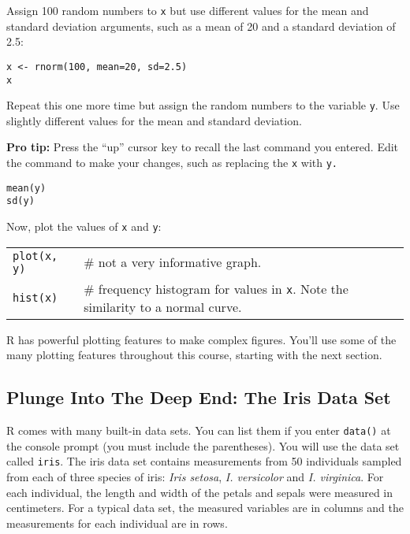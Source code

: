 \documentclass[11pt]{article}
\begin{document}
Assign 100 random numbers to \texttt{x} but use different values for the mean and
standard deviation arguments, such as a mean of 20 and a standard
deviation of 2.5:

\texttt{x \textless{}- rnorm(100, mean=20, sd=2.5)} \\
\texttt{x}

Repeat this one more time but assign the random numbers to the variable
\texttt{y}. Use slightly different values for the mean and standard deviation.

\textbf{Pro tip:} Press the “up” cursor key to recall the last command you entered. Edit the command to make your changes, such as replacing the \texttt{x} with \texttt{y.}

\texttt{mean(y)} \\
\texttt{sd(y)}

Now, plot the values of \texttt{x} and \texttt{y}:

\begin{tabular}{@{}L{1in}L{4.5in}@{}}
\texttt{plot(x, y)} & \# not a very informative graph. \\
\texttt{hist(x)} 	& \# frequency histogram for values in \texttt{x}. Note the similarity to a normal curve.\\
\end{tabular}

R has powerful plotting features to make complex figures.
You'll use some of the many plotting features throughout this course,
starting with the next section.

\subsection*{Plunge Into The Deep End: The Iris Data Set}

R comes with many built-in data sets. You can list them if you enter \texttt{data()} at the console prompt (you must include the parentheses). You will use the data set called
\texttt{iris}. The iris data set contains measurements from 50 individuals sampled from
each of three species of iris: \emph{Iris setosa}, \emph{I. versicolor}
and \emph{I. virginica}. For each individual, the length and width of
the petals and sepals were measured in centimeters. For a typical data
set, the measured variables are in columns and the measurements for each
individual are in rows.
\end{document}
